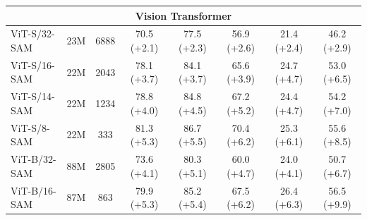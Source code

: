 \documentclass{article}
\begin{document}
\begin{table}
{\begin{tabular}{l|cc|ccc|cc}
    \multicolumn{8}{c}{\textbf{Vision Transformer}} \\ \midrule 
    ViT-S/32-SAM & 23M & 6888 & 70.5 (+2.1) & 77.5 (+2.3) & 56.9 (+2.6) & 21.4 (+2.4) & 46.2 (+2.9) \\ 
    ViT-S/16-SAM & 22M & 2043 & 78.1 (+3.7) & 84.1 (+3.7) & 65.6 (+3.9) & 24.7 (+4.7) & 53.0 (+6.5) \\ 
    ViT-S/14-SAM & 22M & 1234 & 78.8 (+4.0) & 84.8 (+4.5) & 67.2 (+5.2) & 24.4 (+4.7) & 54.2 (+7.0) \\ 
    ViT-S/8-SAM & 22M & 333 & 81.3 (+5.3) & 86.7 (+5.5) & 70.4 (+6.2) & 25.3 (+6.1) & 55.6 (+8.5) \\ 
    
    ViT-B/32-SAM & 88M & 2805 & 73.6 (+4.1) & 80.3 (+5.1) & 60.0 (+4.7) & 24.0 (+4.1) & 50.7 (+6.7)\\ 
    ViT-B/16-SAM & 87M & 863 & 79.9 (+5.3) & 85.2 (+5.4) & 67.5 (+6.2) & 26.4 (+6.3) & 56.5 (+9.9) \\ \midrule
    
    

\end{tabular}}
\end{table}
\end{document}
